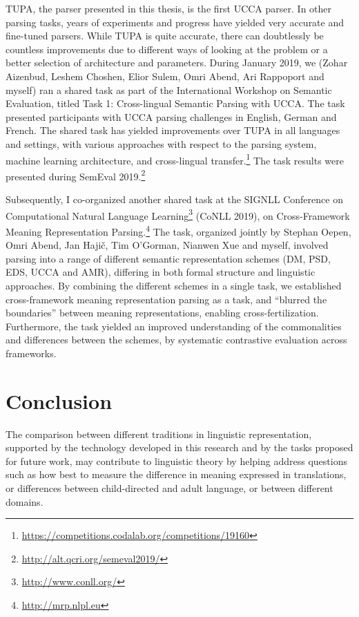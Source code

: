 \documentclass[12pt,a4paper,table]{report}
\begin{document}
TUPA, the parser presented in this thesis, is the first UCCA parser.
In other parsing tasks, years of experiments and progress have yielded very
accurate and fine-tuned parsers.
While TUPA is quite accurate, there can doubtlessly be countless improvements
due to different ways of looking at the problem or a better selection of architecture
and parameters.
During January 2019, we (Zohar Aizenbud, Leshem Choshen, Elior Sulem, Omri Abend,
Ari Rappoport and myself) ran a shared task as part of the
International Workshop on Semantic Evaluation, titled
Task 1: Cross-lingual Semantic Parsing with UCCA.
The task presented participants with UCCA parsing challenges
in English, German and French.
The shared task has yielded improvements over TUPA
in all languages and settings,
with various approaches with respect to the parsing system,
machine learning architecture, and cross-lingual
transfer.\footnote{\url{https://competitions.codalab.org/competitions/19160}}
The task results were presented during SemEval
2019.\footnote{\url{http://alt.qcri.org/semeval2019/}}

Subsequently, I co-organized another shared task at
the SIGNLL Conference on Computational Natural Language
Learning\footnote{\url{http://www.conll.org/}} (CoNLL 2019),
on Cross-Framework Meaning Representation Parsing.\footnote{\url{http://mrp.nlpl.eu}}
The task, organized jointly by Stephan Oepen, Omri Abend, Jan Haji\v{c},
Tim O'Gorman, Nianwen Xue and myself,
involved parsing into a range of different semantic representation schemes
(DM, PSD, EDS, UCCA and AMR), differing in both formal structure and linguistic
approaches.
By combining the different schemes in a single task, we
established cross-framework meaning representation parsing as a task,
and ``blurred the boundaries'' between meaning representations,
enabling cross-fertilization.
Furthermore, the task yielded an improved understanding of the commonalities
and differences between the schemes, by systematic contrastive evaluation
across frameworks.

\section{Conclusion}

The comparison between different traditions in linguistic representation,
supported by the technology developed in this research
and by the tasks proposed for future work,
may contribute to linguistic theory by helping address questions such as
how best to measure the difference in meaning expressed in translations,
or differences between child-directed and adult language,
or between different domains.
\end{document}
